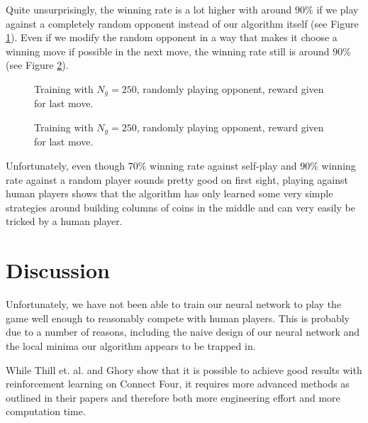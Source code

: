 \documentclass[10pt,twocolumn,letterpaper]{article}
\begin{document}
Quite unsurprisingly, the winning rate is a lot higher with around $90 \%$ if we play against a completely random opponent instead of our algorithm itself (see Figure \ref{fig:last_move_random}).
Even if we modify the random opponent in a way that makes it choose a winning move if possible in the next move, the winning rate still is around $90 \%$ (see Figure \ref{fig:last_move_random_with_winning_move}).
\begin{figure}[t]
    \begin{center}
		\noindent
		\makebox[3.25in]{
	   		
		}
	\end{center}
    \caption{Training with $N_g=250$, randomly playing opponent, reward given for last move.}
	\label{fig:last_move_random}
\end{figure}
\begin{figure}[t]
    \begin{center}
		\noindent
		\makebox[3.25in]{
	   		
		}
	\end{center}
    \caption{Training with $N_g=250$, randomly playing opponent, reward given for last move.}
	\label{fig:last_move_random_with_winning_move}
\end{figure}

Unfortunately, even though $70\%$ winning rate against self-play and $90\%$ winning rate against a random player sounds pretty good on first sight, playing against human players shows that the algorithm has only learned some very simple strategies around building columns of coins in the middle and can very easily
be tricked by a human player.

\section{Discussion}


Unfortunately, we have not been able to train our neural network to play
the game well enough to reasonably compete with human players.
This is probably due to a number of reasons, including the naive design of
our neural network and the local minima our algorithm appears to be trapped in.

While Thill et. al. \cite{Thill} and Ghory \cite{Ghory} show that it is possible to
achieve good results with reinforcement learning on Connect Four, it requires
more advanced methods as outlined in their papers and therefore both more
engineering effort and more computation time.
\end{document}
